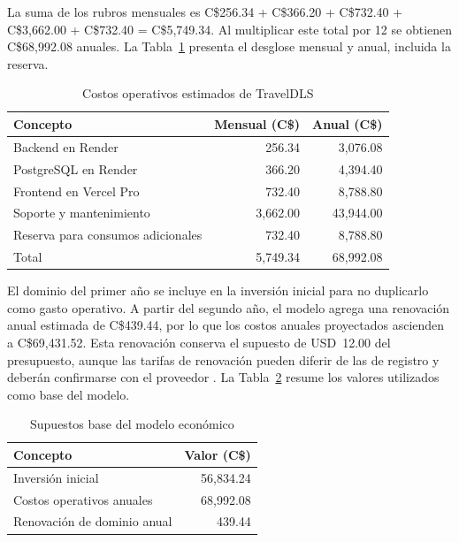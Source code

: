 La suma de los rubros mensuales es C\$256.34 + C\$366.20 + C\$732.40 + C\$3,662.00 + C\$732.40 = C\$5,749.34. Al multiplicar este total por 12 se obtienen C\$68,992.08 anuales. La Tabla~\ref{tab:costos-operativos} presenta el desglose mensual y anual, incluida la reserva.

\begin{table}[H]
\centering
\caption{Costos operativos estimados de TravelDLS}
\label{tab:costos-operativos}
\begin{tabularx}{\textwidth}{>{\RaggedRight\arraybackslash}X r r}
\toprule
Concepto & Mensual (C\$) & Anual (C\$) \\
\midrule
Backend en Render & 256.34 & 3,076.08 \\
PostgreSQL en Render & 366.20 & 4,394.40 \\
Frontend en Vercel Pro & 732.40 & 8,788.80 \\
Soporte y mantenimiento & 3,662.00 & 43,944.00 \\
Reserva para consumos adicionales & 732.40 & 8,788.80 \\
\midrule
Total & 5,749.34 & 68,992.08 \\
\bottomrule
\end{tabularx}
\end{table}

El dominio del primer año se incluye en la inversión inicial para no duplicarlo como gasto operativo. A partir del segundo año, el modelo agrega una renovación anual estimada de C\$439.44, por lo que los costos anuales proyectados ascienden a C\$69,431.52. Esta renovación conserva el supuesto de USD~12.00 del presupuesto, aunque las tarifas de renovación pueden diferir de las de registro y deberán confirmarse con el proveedor \parencite{namecheapdomain,godaddy2026domain}. La Tabla~\ref{tab:supuestos-economicos} resume los valores utilizados como base del modelo.

\begin{table}[H]
\centering
\caption{Supuestos base del modelo económico}
\label{tab:supuestos-economicos}
\begin{tabularx}{\textwidth}{>{\RaggedRight\arraybackslash}X r}
\toprule
Concepto & Valor (C\$) \\
\midrule
Inversión inicial & 56,834.24 \\
Costos operativos anuales & 68,992.08 \\
Renovación de dominio anual & 439.44 \\
\bottomrule
\end{tabularx}
\end{table}

